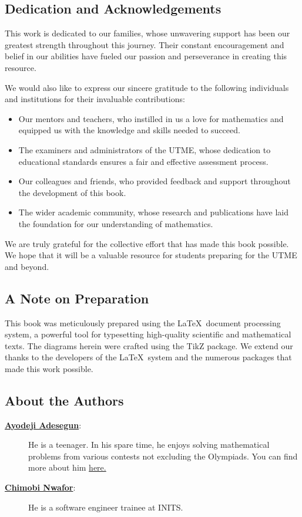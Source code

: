 \documentclass[a4paper]{book}
\begin{document}
\begin{frontmatter}
\pagestyle{plain}

\chapter*{Dedication and Acknowledgements}
This work is dedicated to our families, whose unwavering support has been our greatest strength throughout this journey. Their constant encouragement and belief in our abilities have fueled our passion and perseverance in creating this resource.

We would also like to express our sincere gratitude to the following individuals and institutions for their invaluable contributions:
\begin{itemize}
\item Our mentors and teachers, who instilled in us a love for mathematics and equipped us with the knowledge and skills needed to succeed.
\item The examiners and administrators of the UTME, whose dedication to educational standards ensures a fair and effective assessment process.
\item  Our colleagues and friends, who provided feedback and support throughout the development of this book.
\item The wider academic community, whose research and publications have laid the foundation for our understanding of mathematics.
\end{itemize}
We are truly grateful for the collective effort that has made this book possible. We hope that it will be a valuable resource for students preparing for the UTME and beyond.

\section*{A Note on Preparation}
This book was meticulously prepared using the \LaTeX\ document processing system, a powerful tool for typesetting high-quality scientific and mathematical texts. The diagrams herein were crafted using the TikZ package. We extend our thanks to the developers of the \LaTeX\ system and the numerous packages that made this work possible.

\section*{About the Authors}
\begin{description}
\item[\href{https://linkedin.com/in/ayodejiades}{\textbf{Ayodeji Adesegun}}:] He is a teenager. In his spare time, he enjoys solving mathematical problems from various contests not excluding the Olympiads. You can find more about him \href{https://ayodejiades.vercel.app}{here.}
\item[\href{https://linkedin.com/in/jeremaih-nwafor}{\textbf{Chimobi Nwafor}}:] He is a software engineer trainee at INITS.
\end{description}


\end{frontmatter}
\end{document}
